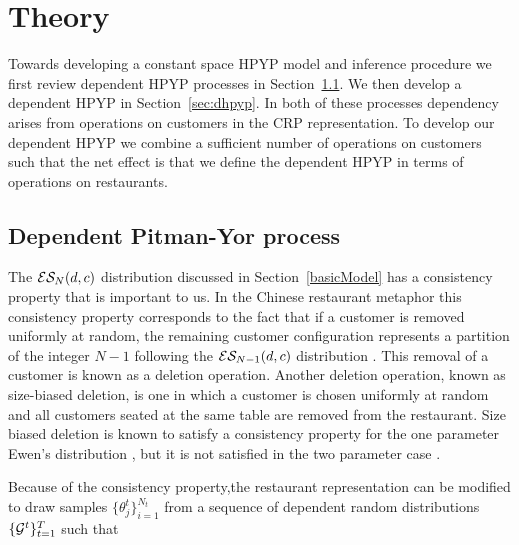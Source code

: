 \section{Theory}
\label{sec:theory}

Towards developing a constant space HPYP model and inference procedure we first review dependent HPYP processes in Section~\ref{sec:dpyp}.  We then develop a dependent HPYP in Section~\ref{sec:dhpyp}. In both of these processes dependency arises from operations on customers in the CRP representation. To develop our dependent HPYP we combine a sufficient number of operations on customers such that the net effect is that we define the dependent HPYP in terms of operations on restaurants.


\subsection{Dependent Pitman-Yor process} 
\label{sec:dpyp}

The $\ES_N(d,c)$ distribution discussed in Section~\ref{basicModel} has a consistency property that is important to us. In the Chinese restaurant metaphor this consistency property corresponds to the fact that if a customer is removed uniformly at random, the remaining customer configuration represents a partition of the integer $N-1$ following the $\ES_{N-1}(d,c)$ distribution \cite{Pitman1995}.  This removal of a customer is known as a deletion operation.  Another deletion operation, known as size-biased deletion, is one in which a customer is chosen uniformly at random and all customers seated at the same table are removed from the restaurant. Size biased deletion is known to satisfy a consistency property for the one parameter Ewen's distribution \cite{Kingman1978}, but it is not satisfied in the two parameter case \cite{Pitman1995}.

Because of the  consistency property,the restaurant representation can be modified to draw samples  $\{ \theta_j^t \}_{i = 1}^{N_t}$ from a sequence of dependent random distributions $\{ \G^t \}_{t=1}^T$ such that 

